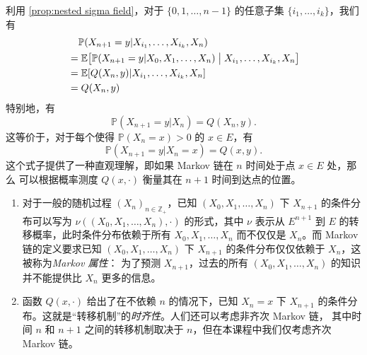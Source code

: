 \documentclass[fontset=none]{Notes}
\begin{document}
利用 \autoref{prop:nested sigma field}，对于 $\{0,1,\dots,n-1\}$ 的任意子集
$\{i_1,\dots,i_k\}$，我们有
\begin{align*}
  &\hphantom{={}}\mathbb{P}(X_{n+1}=y|X_{i_1},\dots,X_{i_k},X_n)\\
  &=\mathbb{E}\bigl[\mathbb{P}(X_{n+1}=y|X_{0},X_1,\dots,X_n)\bigm| X_{i_1},\dots,X_{i_k},X_n\bigr]\\
  &=\mathbb{E}[Q(X_{n},y)|X_{i_1},\dots,X_{i_k},X_n]\\
  &=Q(X_n,y)
\end{align*}
特别地，有
\[
  \mathbb{P}(X_{n+1}=y|X_n)=Q(X_n,y).
\]
这等价于，对于每个使得 $\mathbb{P}(X_n=x)>0$ 的 $x\in E$，有
\[
  \mathbb{P}(X_{n+1}=y|X_n=x)=Q(x,y).
\]
这个式子提供了一种直观理解，即如果 Markov 链在 $n$ 时间处于点 $x\in E$ 处，那么
可以根据概率测度 $Q(x,\cdot)$ 衡量其在 $n+1$ 时间到达点的位置。

\begin{remark}
  \mbox{}
  \begin{enumerate}
    \item 对于一般的随机过程 $(X_n)_{n\in \mathbb{Z}_+}$，已知 $(X_0,X_1,\dots,X_n)$
    下 $X_{n+1}$ 的条件分布可以写为 $\nu((X_0,X_1,\dots,X_n),\cdot)$ 的形式，其中
    $\nu$ 表示从 $E^{n+1}$ 到 $E$ 的转移概率，此时条件分布依赖于所有 $X_0,X_1,\dots,X_n$
    而不仅仅是 $X_n$。而 Markov 链的定义要求已知 $(X_0,X_1,\dots,X_n)$
    下 $X_{n+1}$ 的条件分布仅仅依赖于 $X_n$，这被称为\emph{Markov 属性}：
    为了预测 $X_{n+1}$，过去的所有 $(X_0,X_1,\dots,X_n)$ 的知识并不能提供比 $X_n$
    更多的信息。  
    \item 函数 $Q(x,\cdot)$ 给出了在不依赖 $n$ 的情况下，已知 $X_n=x$ 下 $X_{n+1}$
    的条件分布。这就是“转移机制”的\emph{时齐性}。人们还可以考虑非齐次 Markov 链，
    其中时间 $n$ 和 $n + 1$ 之间的转移机制取决于 $n$，但在本课程中我们仅考虑齐次 Markov 链。
  \end{enumerate}
\end{remark}
\end{document}

